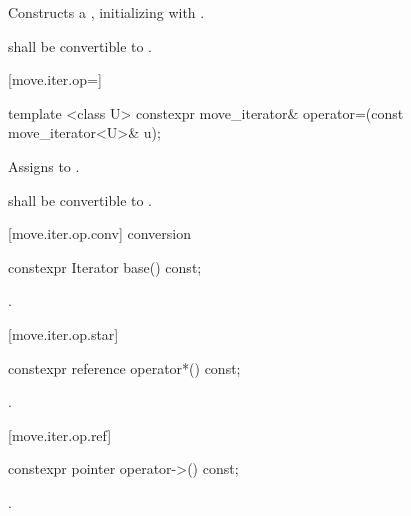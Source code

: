 \begin{itemdescr}
\pnum
\effects Constructs a , initializing
 with .

\pnum
\requires {} shall be convertible to
.
\end{itemdescr}

[move.iter.op=]{}

%
\begin{itemdecl}
template <class U> constexpr move_iterator& operator=(const move_iterator<U>& u);
\end{itemdecl}

\begin{itemdescr}
\pnum
\effects Assigns  to
.

\pnum
\requires {} shall be convertible to
.
\end{itemdescr}

[move.iter.op.conv]{ conversion}

%
\begin{itemdecl}
constexpr Iterator base() const;
\end{itemdecl}

\begin{itemdescr}
\pnum
\returns {}.
\end{itemdescr}

[move.iter.op.star]{}

%
\begin{itemdecl}
constexpr reference operator*() const;
\end{itemdecl}

\begin{itemdescr}
\pnum
\returns {}.
\end{itemdescr}

[move.iter.op.ref]{}

%
\begin{itemdecl}
constexpr pointer operator->() const;
\end{itemdecl}

\begin{itemdescr}
\pnum
\returns {}.
\end{itemdescr}

